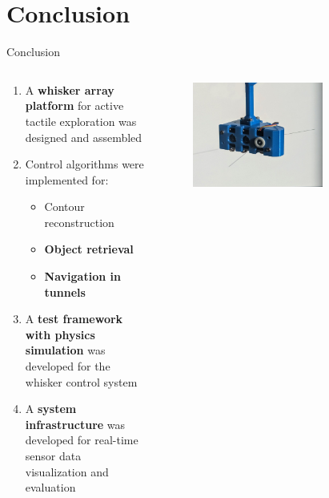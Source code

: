 \documentclass[AIRbeamer
,optEnglish
,optBiber
,optBibstyleAlphabetic
,optBeamerClassicFormat%
]{AIRlatex}
\begin{document}
    \section{Conclusion}
    \begin{frame}{Conclusion}
        \begin{columns}[T,onlytextwidth]
            \begin{column}[T]{0.6\textwidth}
                \begin{minipage}[c][.8\textheight][c]{\linewidth}
                    \begin{enumerate}
                        \item A \textbf{whisker array platform} for active tactile exploration was designed and assembled
                        \item Control algorithms were implemented for:
                        \begin{itemize}
                            \item Contour reconstruction
                            \item \textbf{Object retrieval}
                            \item \textbf{Navigation in tunnels}
                        \end{itemize}
                        \item A \textbf{test framework with physics simulation} was developed for the whisker control system
                        \item A \textbf{system infrastructure} was developed for real-time sensor data visualization and evaluation
                    \end{enumerate}
                \end{minipage}
            \end{column}
            \begin{column}[T]{0.4\textwidth}
                \begin{figure}[H]
                    \centering
                    \includegraphics[width=0.7\textwidth]{figures/platform-two-whiskers}

\end{figure}
\end{column}
\end{columns}
\end{frame}
\end{document}
